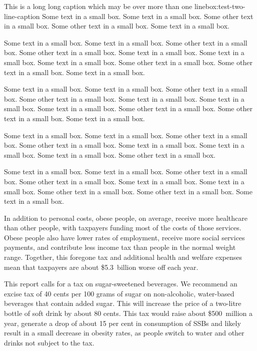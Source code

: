 \documentclass{grattan}
\begin{document}
\begin{verysmallbox}[p]{This is a long long caption which may be over more than one line}{box:test-two-line-caption}
Some text in a small box. 
Some text in a small box. 
Some other text in a small box. 
Some other text in a small box. 
Some text in a small box. 

Some text in a small box. 
Some text in a small box. 
Some other text in a small box. 
Some other text in a small box. 
Some text in a small box. 
Some text in a small box. 
Some text in a small box. 
Some other text in a small box. 
Some other text in a small box. 
Some text in a small box. 

Some text in a small box. 
Some text in a small box. 
Some other text in a small box. 
Some other text in a small box. 
Some text in a small box. 
Some text in a small box. 
Some text in a small box. 
Some other text in a small box. 
Some other text in a small box. 
Some text in a small box. 

Some text in a small box. 
Some text in a small box. 
Some other text in a small box. 
Some other text in a small box. 
Some text in a small box. 
Some text in a small box. 
Some text in a small box. 
Some other text in a small box. 

Some text in a small box. 
Some text in a small box. 
Some other text in a small box. 
Some other text in a small box. 
Some text in a small box. 
Some text in a small box. 
Some other text in a small box. 
Some other text in a small box. 
Some text in a small box. 
\end{verysmallbox}

In addition to personal costs, obese people, on average, receive more healthcare than other people, with taxpayers funding most of the costs of those services.
Obese people also have lower rates of employment, receive more social services payments, and contribute less income tax than people in the normal weight range.
Together, this foregone tax and additional health and welfare expenses mean that taxpayers are about \$5.3~billion worse off each year. 

This report calls for a tax on sugar-sweetened beverages.
We recommend an excise tax of 40 cents per 100 grams of sugar on non-alcoholic, water-based beverages that contain added sugar.
This will increase the price of a two-litre bottle of soft drink by about 80 cents.
This tax would raise about \$500~million a year, generate a drop of about 15 per cent in consumption of SSBs and likely result in a small decrease in obesity rates, as people switch to water and other drinks not subject to the tax. 
\end{document}
